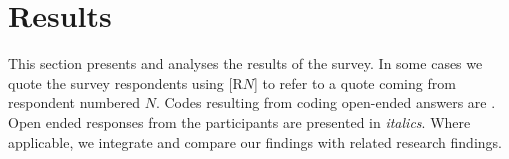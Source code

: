 \section{Results}
\label{sec:results}

This section presents and analyses the results of the survey.
In some cases we quote the survey respondents using [R$N$] to refer to a quote coming from respondent numbered $N$.
Codes resulting from coding open-ended answers are .
Open ended responses from the participants are presented in \emph{italics}.
Where applicable, we integrate and compare our findings with related research findings.

\begin{figure}[ht]
\centering
\vspace{-.3cm}
    \hfill
    \hfill
    \hfill
    \caption{\RQTwo}
     \label{fig:decision_motivations}
     \vspace{-.3cm}
\end{figure}

